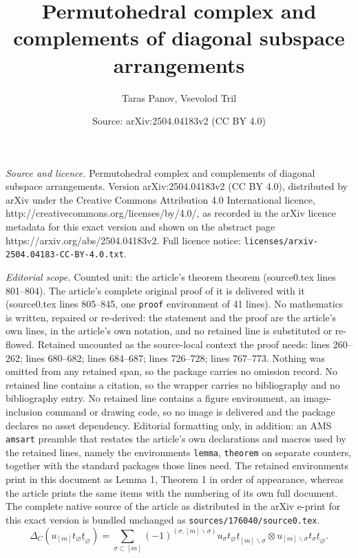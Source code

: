 \documentclass[10pt,a4paper]{amsart}
\title{Permutohedral complex and complements of diagonal subspace arrangements}
\author{Taras Panov, Vsevolod Tril}
\date{Source: arXiv:2504.04183v2 (CC BY 4.0)}
\begin{document}
\maketitle

\noindent\emph{Source and licence.} Permutohedral complex and complements of diagonal subspace arrangements. Version arXiv:2504.04183v2 (CC BY 4.0), distributed by arXiv under the Creative Commons Attribution 4.0 International licence, http://creativecommons.org/licenses/by/4.0/, as recorded in the arXiv licence metadata for this exact version and shown on the abstract page https://arxiv.org/abs/2504.04183v2. Full licence notice: \texttt{licenses/arxiv-2504.04183-CC-BY-4.0.txt}.\par\smallskip

\noindent\textit{Editorial scope.} Counted unit: the article's theorem theorem (source0.tex lines 801--804). The article's complete original proof of it is delivered with it (source0.tex lines 805--845, one \texttt{proof} environment of 41 lines). No mathematics is written, repaired or re-derived: the statement and the proof are the article's own lines, in the article's own notation, and no retained line is substituted or re-flowed.  Retained uncounted as the source-local context the proof needs: lines 260--262; lines 680--682; lines 684--687; lines 726--728; lines 767--773.  Nothing was omitted from any retained span, so the package carries no omission record.  No retained line contains a citation, so the wrapper carries no bibliography and no bibliography entry.  No retained line contains a figure environment, an image-inclusion command or drawing code, so no image is delivered and the package declares no asset dependency.  Editorial formatting only, in addition: an AMS \texttt{amsart} preamble that restates the article's own declarations and macros used by the retained lines, namely the environments \texttt{lemma}, \texttt{theorem} on separate counters, together with the standard packages those lines need.  The retained environments print in this document as Lemma 1, Theorem 1 in order of appearance, whereas the article prints the same items with the numbering of its own full document.  The complete native source of the article as distributed in the arXiv e-print for this exact version is bundled unchanged as \texttt{sources/176040/source0.tex}.
\begin{equation}\label{DeltaC}
  \Delta_{C}(u_{[m]} t_\varnothing \underline{t}_{\varnothing}) = \sum_{\sigma \subset [m]} (-1)^{(\sigma, [m] \backslash \sigma)} u_{\sigma} t_\varnothing \underline{t}_{[m] \backslash \sigma} \otimes u_{[m] \backslash \sigma} t_{\sigma} \underline{t}_{\varnothing}.
\end{equation}  
\end{document}
